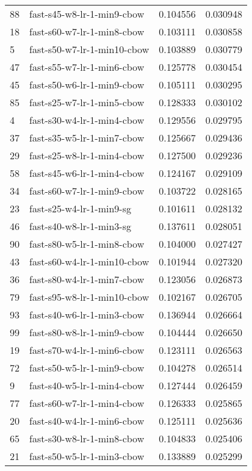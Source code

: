 {\begin{tabular}{llrr}
88 &   fast-s45-w8-lr-1-min9-cbow &  0.104556 &  0.030948 \\
18 &   fast-s60-w7-lr-1-min8-cbow &  0.103111 &  0.030858 \\
5  &  fast-s50-w7-lr-1-min10-cbow &  0.103889 &  0.030779 \\
47 &   fast-s55-w7-lr-1-min6-cbow &  0.125778 &  0.030454 \\
45 &   fast-s50-w6-lr-1-min9-cbow &  0.105111 &  0.030295 \\
85 &   fast-s25-w7-lr-1-min5-cbow &  0.128333 &  0.030102 \\
4  &   fast-s30-w4-lr-1-min4-cbow &  0.129556 &  0.029795 \\
37 &   fast-s35-w5-lr-1-min7-cbow &  0.125667 &  0.029436 \\
29 &   fast-s25-w8-lr-1-min4-cbow &  0.127500 &  0.029236 \\
58 &   fast-s45-w6-lr-1-min4-cbow &  0.124167 &  0.029109 \\
34 &   fast-s60-w7-lr-1-min9-cbow &  0.103722 &  0.028165 \\
23 &     fast-s25-w4-lr-1-min9-sg &  0.101611 &  0.028132 \\
46 &     fast-s40-w8-lr-1-min3-sg &  0.137611 &  0.028051 \\
90 &   fast-s80-w5-lr-1-min8-cbow &  0.104000 &  0.027427 \\
43 &  fast-s60-w4-lr-1-min10-cbow &  0.101944 &  0.027320 \\
36 &   fast-s80-w4-lr-1-min7-cbow &  0.123056 &  0.026873 \\
79 &  fast-s95-w8-lr-1-min10-cbow &  0.102167 &  0.026705 \\
93 &   fast-s40-w6-lr-1-min3-cbow &  0.136944 &  0.026664 \\
99 &   fast-s80-w8-lr-1-min9-cbow &  0.104444 &  0.026650 \\
19 &   fast-s70-w4-lr-1-min6-cbow &  0.123111 &  0.026563 \\
72 &   fast-s50-w5-lr-1-min9-cbow &  0.104278 &  0.026514 \\
9  &   fast-s40-w5-lr-1-min4-cbow &  0.127444 &  0.026459 \\
77 &   fast-s60-w7-lr-1-min4-cbow &  0.126333 &  0.025865 \\
20 &   fast-s40-w4-lr-1-min6-cbow &  0.125111 &  0.025636 \\
65 &   fast-s30-w8-lr-1-min8-cbow &  0.104833 &  0.025406 \\
21 &   fast-s50-w5-lr-1-min3-cbow &  0.133889 &  0.025299 \\

\end{tabular}}
